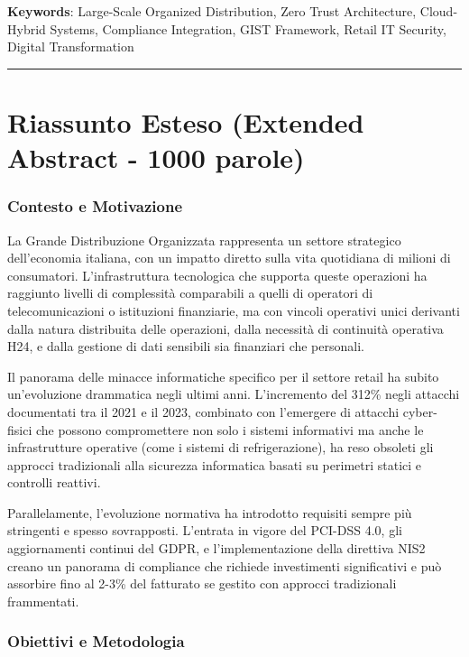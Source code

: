 \documentclass[12pt,a4paper,oneside]{book}
\begin{document}
\textbf{Keywords}: Large-Scale Organized Distribution, Zero Trust
Architecture, Cloud-Hybrid Systems, Compliance Integration, GIST
Framework, Retail IT Security, Digital Transformation

\begin{center}\rule{0.5\linewidth}{0.5pt}\end{center}

\section{Riassunto Esteso (Extended Abstract - 1000
parole)}\label{riassunto-esteso-extended-abstract---1000-parole}

\subsubsection{Contesto e Motivazione}\label{contesto-e-motivazione}

La Grande Distribuzione Organizzata rappresenta un settore strategico
dell'economia italiana, con un impatto diretto sulla vita quotidiana di
milioni di consumatori. L'infrastruttura tecnologica che supporta queste
operazioni ha raggiunto livelli di complessità comparabili a quelli di
operatori di telecomunicazioni o istituzioni finanziarie, ma con vincoli
operativi unici derivanti dalla natura distribuita delle operazioni,
dalla necessità di continuità operativa H24, e dalla gestione di dati
sensibili sia finanziari che personali.

Il panorama delle minacce informatiche specifico per il settore retail
ha subito un'evoluzione drammatica negli ultimi anni. L'incremento del
312\% negli attacchi documentati tra il 2021 e il 2023, combinato con
l'emergere di attacchi cyber-fisici che possono compromettere non solo i
sistemi informativi ma anche le infrastrutture operative (come i sistemi
di refrigerazione), ha reso obsoleti gli approcci tradizionali alla
sicurezza informatica basati su perimetri statici e controlli reattivi.

Parallelamente, l'evoluzione normativa ha introdotto requisiti sempre
più stringenti e spesso sovrapposti. L'entrata in vigore del PCI-DSS
4.0, gli aggiornamenti continui del GDPR, e l'implementazione della
direttiva NIS2 creano un panorama di compliance che richiede
investimenti significativi e può assorbire fino al 2-3\% del fatturato
se gestito con approcci tradizionali frammentati.

\subsubsection{Obiettivi e Metodologia}\label{obiettivi-e-metodologia}
\end{document}
